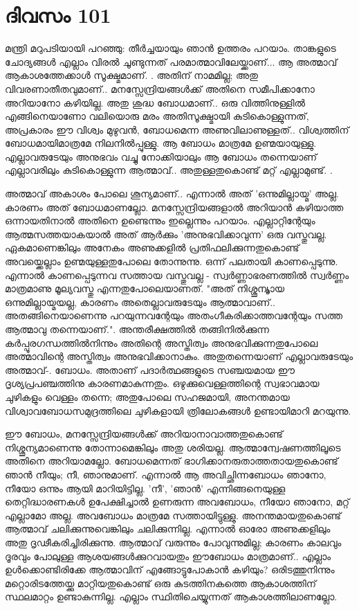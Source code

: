  
\section{ദിവസം 101}


മന്ത്രി മറുപടിയായി പറഞ്ഞു: തീര്‍ച്ചയായും ഞാന്‍ ഉത്തരം പറയാം. താങ്കളുടെ ചോദ്യങ്ങള്‍ എല്ലാം വിരല്‍ ചൂണ്ടുന്നത്‌ പരമാത്മാവിലേയ്ക്കാണ്‌...  ആ അത്മാവ്‌ ആകാശത്തേക്കാള്‍ സൂക്ഷ്മമാണ്‌. . അതിന്‌ നാമമില്ല; അതു വിവരണാതീതവുമാണ്‌.. മനസ്സേന്ദ്രിയങ്ങള്‍ക്ക്‌ അതിനെ സമീപിക്കാനോ അറിയാനോ കഴിയില്ല. അതു ശുദ്ധ ബോധമാണ്‌.. ഒരു വിത്തിനുള്ളില്‍ എങ്ങിനെയാണോ വലിയൊരു മരം അതിസൂക്ഷ്മായി കുടികൊള്ളുന്നത്‌, അപ്രകാരം ഈ വിശ്വം മുഴുവന്‍, ബോധമെന്ന അണുവിലാണുള്ളത്‌.. വിശ്വത്തിന്‌ ബോധമായിമാത്രമേ നിലനില്‍പ്പുള്ളു. ആ ബോധം മാത്രമേ ഉണ്മയായുള്ളു. എല്ലാവരുടേയും അനുഭവം വച്ചു നോക്കിയാലും ആ ബോധം തന്നെയാണ്‌ എല്ലാവരിലും കുടികൊള്ളുന്ന ആത്മാവ്‌.. അതുള്ളതുകൊണ്ട്‌ മറ്റ്‌ എല്ലാമുണ്ട്‌. .

അത്മാവ്‌ അകാശം പോലെ ശൂന്യമാണ്‌.. എന്നാല്‍ അത്‌ 'ഒന്നുമില്ലായ്മ' അല്ല. കാരണം അത്‌ ബോധമാണല്ലോ. മനസ്സേന്ദ്രിയങ്ങളാല്‍ അറിയാന്‍ കഴിയാത്ത ഒന്നായതിനാല്‍ അതിനെ ഉണ്ടെന്നും ഇല്ലെന്നും പറയാം. എല്ലാറ്റിന്റേയും ആത്മസത്തയാകയാല്‍ അത്‌ ആര്‍ക്കും 'അനുഭവിക്കാവുന്ന' ഒരു വസ്തുവല്ല. ഏകമാണെങ്കിലും അനേകം അണുക്കളില്‍ പ്രതിഫലിക്കുന്നതുകൊണ്ട്‌ അവയ്ക്കെല്ലാം ഉണ്മയുള്ളതുപോലെ തോന്നുന്നു. ഒന്ന് പലതായി കാണപ്പെടുന്നു. എന്നാല്‍ കാണപ്പെടുന്നവ സത്തായ വസ്തുവല്ല - സ്വര്‍ണ്ണാഭരണത്തില്‍ സ്വര്‍ണ്ണം മാത്രമാണു മൂല്യവസ്തു എന്നതുപോലെയാണത്‌. "അത്‌ നിശ്ശൂന്യ്മായ ഒന്നുമില്ലായ്മയല്ല, കാരണം അതെല്ലാവരുടേയും ആത്മാവാണ്‌.. അതങ്ങിനെയാണെന്നു പറയുന്നവന്റേയും അതംഗീകരിക്കാത്തവന്റേയും സത്ത ആത്മാവു തന്നെയാണ്‌.". അന്തരീക്ഷത്തില്‍ തങ്ങിനില്‍ക്കുന്ന കര്‍പ്പൂരഗന്ധത്തില്‍നിന്നും അതിന്റെ അസ്തിത്വം അനുഭവിക്കുന്നതുപോലെ അത്മാവിന്റെ അസ്തിത്വം അനുഭവിക്കാനാകും. അതുതന്നെയാണ്‌ എല്ലാവരുടേയും അത്മാവ്‌-. ബോധം. അതാണ്‌ പദാര്‍ത്ഥങ്ങളുടെ സഞ്ചയമായ ഈ ദൃശ്യപ്രപഞ്ചത്തിനു കാരണമാകുന്നതും. ഒഴുക്കുവെള്ളത്തിന്റെ സ്വഭാവമായ ചുഴികളും വെള്ളം തന്നെ; അതുപോലെ സഹജമായി, അനന്തമായ വിശ്വാവബോധസമുദ്രത്തിലെ ചുഴികളായി ത്രിലോകങ്ങള്‍ ഉണ്ടായിമാറി മറയുന്നു. 

ഈ ബോധം, മനസ്സേന്ദ്രിയങ്ങള്‍ക്ക്‌ അറിയാനാവാത്തതുകൊണ്ട്‌ നിശ്ശൂന്യമാണെന്നു തോന്നാമെങ്കിലും അതു ശരിയല്ല. ആത്മാന്വേഷണത്തിലൂടെ അതിനെ അറിയാമല്ലോ. ബോധമെന്നത്‌ ഭാഗിക്കാനരുതാത്തതായതുകൊണ്ട്‌ ഞാന്‍ നീയും; നീ, ഞാനുമാണ്‌. എന്നാല്‍ ആ അവിച്ഛിന്നബോധം ഞാനോ, നീയോ ഒന്നും ആയി മാറിയിട്ടില്ല. 'നീ', 'ഞാന്‍' എന്നിങ്ങനെയുള്ള തെറ്റിദ്ധാരണകള്‍ ഉപേക്ഷിച്ചാല്‍ ഉണരുന്ന അവബോധം, നീയോ ഞാനോ, മറ്റ്‌ എല്ലാമോ അല്ല. അവബോധം മാത്രമേ സത്തായിട്ടുള്ളു. അനന്തമായതുകൊണ്ട്‌ ആത്മാവ്‌ ചലിക്കുന്നുവെങ്കിലും ചലിക്കുന്നില്ല. എന്നാല്‍ ഓരോ അണുക്കളിലും അതു ദൃഢീകരിച്ചിരിക്കുന്നു. ആത്മാവ്‌ വരുന്നും പോവുന്നുമില്ല; കാരണം കാലവും ദൂരവും പോലുള്ള ആശയങ്ങള്‍ക്കുറവായതും ഈബോധം മാത്രമാണ്‌.. എല്ലാം ഉള്‍ക്കൊണ്ടിരിക്കേ ആത്മാവിന്‌ എങ്ങോട്ടുപോകാന്‍ കഴിയും? ഒരിടത്തുനിന്നും മറ്റൊരിടത്തേയ്ക്കു മാറ്റിയതുകൊണ്ട്‌ ഒരു കുടത്തിനകത്തെ ആകാശത്തിന്‌ സ്ഥലമാറ്റം ഉണ്ടാകുന്നില്ല. എല്ലാം സ്ഥിതിചെയ്യുന്നത്‌ ആകാശത്തിലാണല്ലോ. 

